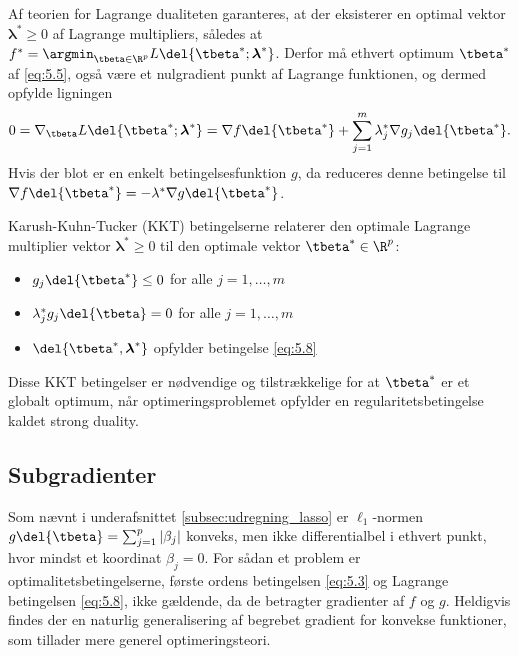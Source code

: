 Af teorien for Lagrange dualiteten garanteres, at der eksisterer en optimal vektor \(\boldsymbol{\lambda}^* \geq 0\) af Lagrange multipliers, således at 
\(f^* = \argmin_{\tbeta \in \R^p} L \del{\tbeta^*; \boldsymbol{\lambda}^*}\).
Derfor må ethvert optimum \(\tbeta^*\) af \eqref{eq:5.5}, også være et nulgradient punkt af Lagrange funktionen, og dermed opfylde ligningen 
\begin{align}
0 = \nabla_{\tbeta} L \del{\tbeta^*; \boldsymbol{\lambda}^*} = \nabla f \del{\tbeta^*} + \sum_{j=1}^m \lambda_j^* \nabla g_j \del{\tbeta^*}. \label{eq:5.8}
\end{align}
Hvis der blot er en enkelt betingelsesfunktion \(g\), da reduceres denne betingelse til \(\nabla f \del{\tbeta^*} = - \lambda^* \nabla g \del{\tbeta^*}\).

Karush-Kuhn-Tucker (KKT) betingelserne relaterer den optimale Lagrange multiplier vektor \(\boldsymbol{\lambda}^* \geq 0\) til den optimale vektor \(\tbeta^* \in \R^p\):
\begin{itemize}
\item \(g_j \del{\tbeta^*} \leq 0\) for alle \(j = 1, \ldots, m\)
\item \(\lambda_j^* g_j \del{\tbeta} = 0\) for alle \(j = 1, \ldots, m\)
\item \(\del{\tbeta^*, \boldsymbol{\lambda}^*}\) opfylder betingelse \eqref{eq:5.8}
\end{itemize}
Disse KKT betingelser er nødvendige og tilstrækkelige for at \(\tbeta^*\) er et globalt optimum, når optimeringsproblemet opfylder en regularitetsbetingelse kaldet strong duality.
%
\subsection{Subgradienter}
Som nævnt i underafsnittet \ref{subsec:udregning_lasso} er \(\ell_1\)-normen \(g \del{\tbeta} = \sum_{j=1}^p \vert \beta_j \vert\) konveks, men ikke differentialbel i ethvert punkt, hvor mindst et koordinat \(\beta_j = 0\).
For sådan et problem er optimalitetsbetingelserne, første ordens betingelsen \eqref{eq:5.3} og Lagrange betingelsen \eqref{eq:5.8}, ikke gældende, da de betragter gradienter af \(f\) og \(g\).
Heldigvis findes der en naturlig generalisering af begrebet gradient for konvekse funktioner, som tillader mere generel optimeringsteori.

